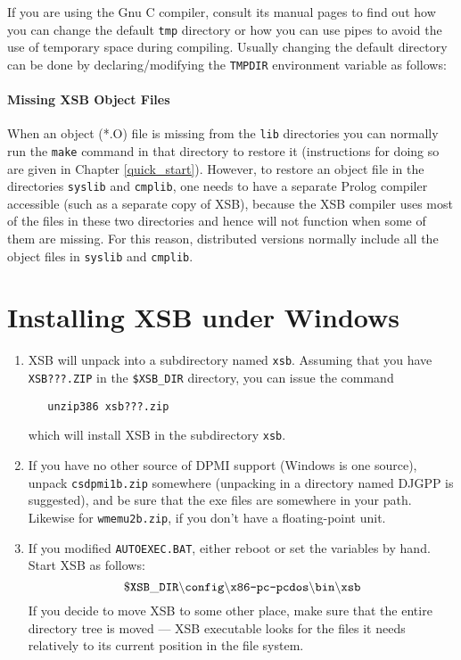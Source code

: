 
\noindent
If you are using the Gnu C compiler, consult its manual pages
to find out how you can change the default {\tt tmp} directory or how you
can use pipes to avoid the use of temporary space during compiling.
Usually changing the default directory can be done by declaring/modifying
the {\tt TMPDIR} environment variable as follows:


\paragraph*{Missing XSB Object Files}
When an object (*.O) file is missing from the {\tt lib} directories you can
normally run the {\tt make} command  in that directory to restore it
(instructions for doing so are given in Chapter
\ref{quick_start}).  However, to restore an object file in the
directories {\tt syslib} and {\tt cmplib}, one needs to have a
separate Prolog compiler accessible (such as a separate copy of
XSB), because the XSB compiler uses most of the files in these
two directories and hence will not function when some of them are
missing.  For this reason, distributed versions normally include all
the object files in {\tt syslib} and {\tt cmplib}.



\section{Installing XSB under Windows} \label{quick:DOS}

\begin{enumerate}
\item 
   XSB will unpack into a subdirectory named {\tt xsb}.
   Assuming that you have {\tt XSB???.ZIP} in the {\tt \$XSB\_DIR} directory,
   you can issue the command
\begin{verbatim}
   unzip386 xsb???.zip
\end{verbatim}
   which will install XSB in the subdirectory {\tt xsb}.

\item 
   If you have no other source of DPMI support (Windows is one source),
   unpack {\tt csdpmi1b.zip} somewhere (unpacking in a directory named
   DJGPP is suggested), and be sure that the exe files are somewhere
   in your path.  Likewise for {\tt wmemu2b.zip}, if you don't have a
   floating-point unit.

\item 
   If you modified {\tt AUTOEXEC.BAT}, either reboot or set the variables
   by hand.  Start XSB as follows:
\[
  \tt
   \$XSB\_DIR \backslash config\backslash \mbox{\tt
   x86-pc-pcdos}\backslash bin \backslash xsb
\]
If you decide to move XSB to some other place, make sure that the entire
   directory tree is moved --- XSB executable looks for the files it needs
   relatively to its current position in the file system.

\end{enumerate}


